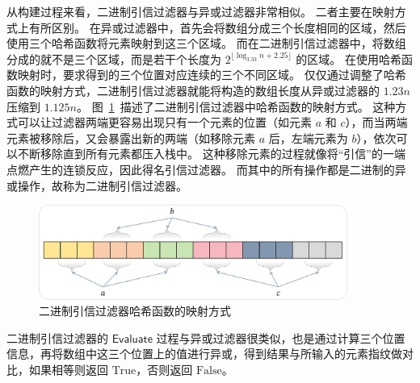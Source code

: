 从构建过程来看，二进制引信过滤器与异或过滤器非常相似。
二者主要在映射方式上有所区别。
在异或过滤器中，首先会将数组分成三个长度相同的区域，然后使用三个哈希函数将元素映射到这三个区域。
而在二进制引信过滤器中，将数组分成的就不是三个区域，而是若干个长度为 $2^{\lfloor \log_{3.33}n + 2.25\rfloor}$ 的区域。
在使用哈希函数映射时，要求得到的三个位置对应连续的三个不同区域。
仅仅通过调整了哈希函数的映射方式，二进制引信过滤器就能将构造的数组长度从异或过滤器的 $1.23n$ 压缩到 $1.125n$。
图~\ref{fig:binary_exp}~描述了二进制引信过滤器中哈希函数的映射方式。
这种方式可以让过滤器两端更容易出现只有一个元素的位置（如元素 $a$ 和 $c$），而当两端元素被移除后，又会暴露出新的两端（如移除元素 $a$ 后，左端元素为 $b$），依次可以不断移除直到所有元素都压入栈中。
这种移除元素的过程就像将``引信''的一端点燃产生的连锁反应，因此得名引信过滤器。
而其中的所有操作都是二进制的异或操作，故称为二进制引信过滤器。
\begin{figure}[ht]
  \centering
  \includegraphics[width=0.9\textwidth]{figures/binary_exp.pdf}
  \caption{二进制引信过滤器哈希函数的映射方式}
  \label{fig:binary_exp}
\end{figure}

二进制引信过滤器的 $\mathsf{Evaluate}$ 过程与异或过滤器很类似，也是通过计算三个位置信息，再将数组中这三个位置上的值进行异或，得到结果与所输入的元素指纹做对比，如果相等则返回 $\mbox{True}$，否则返回 $\mbox{False}$。

